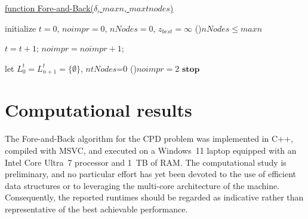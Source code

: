 \documentclass[runningheads]{llncs}
\begin{document}
\begin{algorithm}

   \underline{function Fore-and-Back($\delta$, $maxn$, $maxtnodes$)}\;

   initialize $t=0$, $noimpr = 0$, $nNodes=0$, $z_{best}=\infty$\label{FaB:algo:init}\;
   \While(){$nNodes \leq maxn$}{
      $t=t+1$; $noimpr = noimpr+1$;\

      let $L^t_0 = L_{n+1}^t = \{ \emptyset \}$, $ntNodes$=0\label{FaB:algo:outer_loop}\;
      \lIf(){$noimpr = 2$}{
         $\textbf{stop}$
      }

   }
   \caption{Algorithm Fore-and-Back}
   \label{FaB:peudocode}
\end{algorithm}

\section{Computational results}		\label{sec:computational}
The Fore-and-Back algorithm for the CPD problem was implemented in $\text{C++}$, compiled with MSVC, and executed on a Windows~11 laptop equipped with an Intel Core Ultra~7 processor and 1~TB of RAM. The computational study is preliminary, and no particular effort has yet been devoted to the use of efficient data structures or to leveraging the multi-core architecture of the machine. Consequently, the reported runtimes should be regarded as indicative rather than representative of the best achievable performance.
\end{document}
